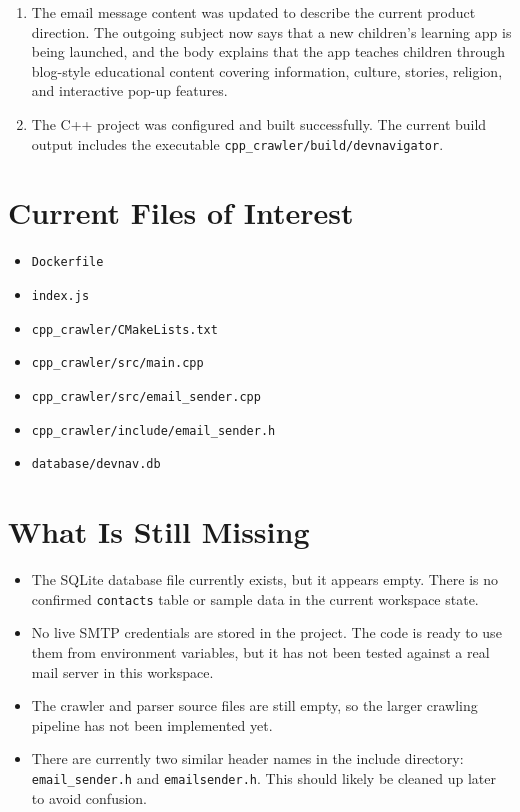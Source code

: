 \documentclass[11pt]{article}
\begin{document}
\begin{enumerate}
  \item The email message content was updated to describe the current product direction. The outgoing subject now says that a new children's learning app is being launched, and the body explains that the app teaches children through blog-style educational content covering information, culture, stories, religion, and interactive pop-up features.

  \item The C++ project was configured and built successfully. The current build output includes the executable \texttt{cpp\_crawler/build/devnavigator}.
\end{enumerate}

\section*{Current Files of Interest}
\begin{itemize}
  \item \texttt{Dockerfile}
  \item \texttt{index.js}
  \item \texttt{cpp\_crawler/CMakeLists.txt}
  \item \texttt{cpp\_crawler/src/main.cpp}
  \item \texttt{cpp\_crawler/src/email\_sender.cpp}
  \item \texttt{cpp\_crawler/include/email\_sender.h}
  \item \texttt{database/devnav.db}
\end{itemize}

\section*{What Is Still Missing}
\begin{itemize}
  \item The SQLite database file currently exists, but it appears empty. There is no confirmed \texttt{contacts} table or sample data in the current workspace state.

  \item No live SMTP credentials are stored in the project. The code is ready to use them from environment variables, but it has not been tested against a real mail server in this workspace.

  \item The crawler and parser source files are still empty, so the larger crawling pipeline has not been implemented yet.

  \item There are currently two similar header names in the include directory: \texttt{email\_sender.h} and \texttt{emailsender.h}. This should likely be cleaned up later to avoid confusion.
\end{itemize}
\end{document}
